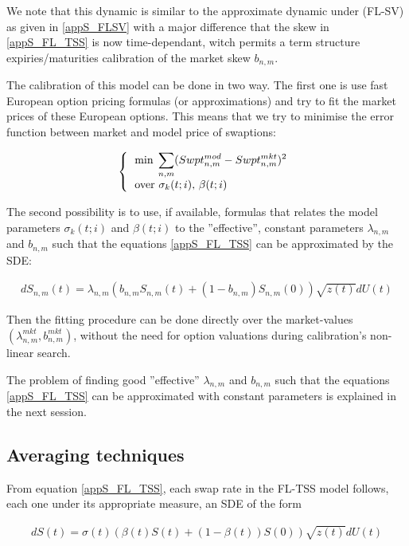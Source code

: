 \documentclass[12pt,a4paper]{article}
\begin{document}
We note that this dynamic is similar to the approximate dynamic under (FL-SV) as given in \ref{appS_FLSV} with a major difference that the skew in \ref{appS_FL_TSS} is now time-dependant, witch permits a  term structure expiries/maturities calibration of the market skew $b_{n,m}$.

The calibration of this model can be done in two way. The first one is use fast European option pricing formulas (or approximations) and try to fit the market prices of these European options.
This means that we try to minimise the error function between market and model price of swaptions:

\begin{equation*}
\left\{
\begin{tabular}{l}
    $\displaystyle   \min \; \sum_{n,m} (Swpt^{mod}_{n,m}-Swpt^{mkt}_{n,m})^2$ \\
    over $\sigma_k(t;i),$ $\beta(t;i)$
\end{tabular}
\right.
\end{equation*}

The second possibility is to use, if available, formulas that relates the model parameters $\sigma_k(t;i)$ and $\beta(t;i)$ to the  ''effective'', constant parameters $\lambda_{n,m}$ and $b_{n,m}$ such that the equations \ref{appS_FL_TSS} can be approximated by the SDE:

\begin{eqnarray}
\label{appS_eff}
d S_{n,m}(t) = \lambda_{n,m} \left( b_{n,m} S_{n,m}(t) + (1-b_{n,m})S_{n,m}(0)\right)  \sqrt{z(t)} dU(t) 
\end{eqnarray}

Then the fitting procedure can be done directly over the market-values $(\lambda^{mkt}_{n,m}, b^{mkt}_{n,m})$, without the need for option valuations during calibration’s non-linear search. 

The problem of finding good ''effective'' $\lambda_{n,m}$ and $b_{n,m}$ such that the equations \ref{appS_FL_TSS} can be approximated with constant parameters is explained in the next session.

\subsection{Averaging techniques}

From equation \ref{appS_FL_TSS}, each swap rate in the FL-TSS model follows, each one under its appropriate measure, an SDE of the form

\begin{eqnarray}
\label{appS}
d S(t) = \sigma(t) \left( \beta(t) S(t) + (1-\beta(t))S(0)\right)  \sqrt{z(t)} dU(t) 
\end{eqnarray}
\end{document}
